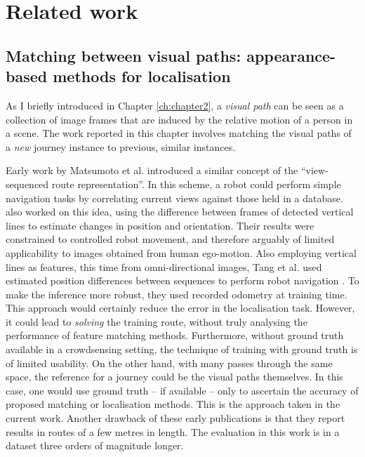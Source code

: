 \section{Related work}
\label{sec:retrieval}

\subsection{Matching between visual paths: appearance-based methods for localisation} 
\label{subsec:early_works}
 
As I briefly introduced in Chapter \ref{ch:chapter2}, a \textit{visual path} can be seen as a collection of image frames that are induced by the relative motion of a person in a scene. The work reported in this chapter involves matching the visual paths of a \textit{new} journey instance to previous, similar instances. 

Early work by Matsumoto et al. \cite{Matsumoto1996} introduced a similar concept of the ``view-sequenced route representation''.  In this scheme,  a robot could perform simple navigation tasks by correlating current views against those held in a database. \citet{Ohno1996} also worked on this idea, using the difference between frames of detected vertical lines to estimate changes in position and orientation. Their results were constrained to controlled robot movement, and therefore arguably of limited applicability to images obtained from human ego-motion. Also employing vertical lines as features, this time from omni-directional images, Tang et al. used estimated position differences between sequences to perform  robot navigation \cite{Tang2001}. To make the inference more robust, they used recorded odometry at training time. This approach would certainly reduce the error in the localisation task. However, it could lead to \textit{solving} the training  route, without truly analysing the performance of feature matching methods. Furthermore, without ground truth available in a crowdsensing setting, the technique of training with ground truth is of limited usability.  On the other hand, with many passes through the same space, the reference for a journey could be the visual paths themselves. In this case, one would use ground truth -- if available -- only to ascertain the accuracy of proposed matching or localisation methods. This is the approach taken in the current work. Another drawback of these early publications is that they report results in routes of a few metres in length. The evaluation in this work is in a dataset three orders of magnitude longer.

